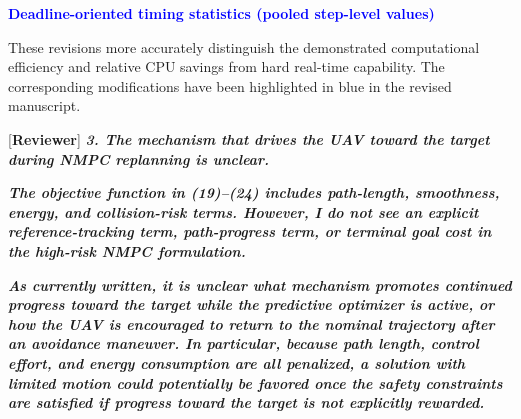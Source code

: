 \documentclass[12pt, twosides]{article}
\theoremstyle{definition}
\begin{document}
\begin{table}[t]
	\medskip
	\textcolor{blue}{\textbf{Deadline-oriented timing statistics (pooled step-level values)}}\\
\end{table}

\clearpage

These revisions more accurately distinguish the demonstrated computational efficiency and relative CPU savings from hard real-time capability. The corresponding modifications have been highlighted in blue in the revised manuscript.

\medskip

\textcolor[rgb]{0.00,0.00,1.00}{[\textbf {Reviewer}]} \textit{\textbf{3. The mechanism that drives the UAV toward the target during NMPC replanning is unclear.}}

\textit{\textbf{The objective function in (19)--(24) includes path-length, smoothness, energy, and collision-risk terms. However, I do not see an explicit reference-tracking term, path-progress term, or terminal goal cost in the high-risk NMPC formulation.}}

\textit{\textbf{As currently written, it is unclear what mechanism promotes continued progress toward the target while the predictive optimizer is active, or how the UAV is encouraged to return to the nominal trajectory after an avoidance maneuver. In particular, because path length, control effort, and energy consumption are all penalized, a solution with limited motion could potentially be favored once the safety constraints are satisfied if progress toward the target is not explicitly rewarded.}}
\end{document}
